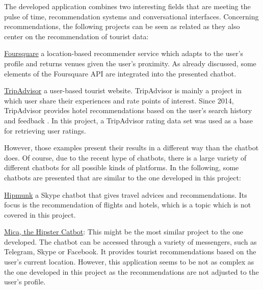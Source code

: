 
The developed application combines two interesting fields that are meeting the pulse of time, recommendation systems and conversational interfaces. Concerning recommendations, the following projects can be seen as related as they also center on the recommendation of tourist data:
\begin{description}
\item \href{https://foursquare.com/}{Foursquare} a location-based recommender service which adapts to the user’s profile and returns venues given the user’s proximity. As already discussed, some elements of the Foursquare API are integrated into the presented chatbot. 
\item \href{https://www.tripadvisor.com/}{TripAdvisor} a user-based tourist website. TripAdvisor is mainly a project in which user share their experiences and rate points of interest. Since 2014, TripAdvisor provides hotel recommendations based on the user’s search history and feedback \cite{tripadvisor:recommender}. In this project, a TripAdvisor rating data set was used as a base for retrieving user ratings.
\end{description}

However, those examples present their results in a different way than the chatbot does. Of course, due to the recent hype of chatbots, there is a large variety of different chatbots for all possible kinds of platforms. In the following, some chatbots are presented that are similar to the one developed in this project:
\begin{description}
\item \href{https://www.hipmunk.com/tailwind/hello-hipmunk-bot-for-skype/}{Hipmunk} a Skype chatbot that gives travel advices and recommendations. Its focus is the recommendation of flights and hotels, which is a topic which is not covered in this project.
\item \href{https://hipstercatbot.com/)}{Mica, the Hipster Catbot}: This might be the most similar project to the one developed. The chatbot can be accessed through a variety of messengers, such as Telegram, Skype or Facebook. It provides tourist recommendations based on the user’s current location. However, this application seems to be not as complex as the one developed in this project as the recommendations are not adjusted to the user’s profile.
\end{description}